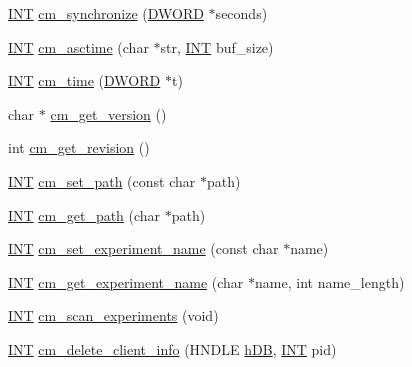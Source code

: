 \begin{DoxyCompactItemize}
\item 
\hyperlink{vppg_8h_a392e62da233ed3e2f7c3fd4f487a3896}{INT} \hyperlink{group__cmfunctionc_ga89d09a1a52a983be86ef502614fe555c}{cm\_\-synchronize} (\hyperlink{vt2_8h_a798af1e30bc65f319c1a246cecf59e39}{DWORD} $\ast$seconds)
\item 
\hyperlink{vppg_8h_a392e62da233ed3e2f7c3fd4f487a3896}{INT} \hyperlink{group__cmfunctionc_gac340cbe250a502de8befa8c0beeac945}{cm\_\-asctime} (char $\ast$str, \hyperlink{vppg_8h_a392e62da233ed3e2f7c3fd4f487a3896}{INT} buf\_\-size)
\item 
\hyperlink{vppg_8h_a392e62da233ed3e2f7c3fd4f487a3896}{INT} \hyperlink{group__cmfunctionc_gaf53e87e278dd31007a84cf643eddba2b}{cm\_\-time} (\hyperlink{vt2_8h_a798af1e30bc65f319c1a246cecf59e39}{DWORD} $\ast$t)
\item 
char $\ast$ \hyperlink{group__cmfunctionc_ga9e7d38eff9b9d85d57fc2f4b2aacc9ab}{cm\_\-get\_\-version} ()
\item 
int \hyperlink{group__cmfunctionc_ga2bdca42b13df835e667b9258cb41c7e2}{cm\_\-get\_\-revision} ()
\item 
\hyperlink{vppg_8h_a392e62da233ed3e2f7c3fd4f487a3896}{INT} \hyperlink{group__cmfunctionc_ga006e27d46e2dd0eedde0a753f1b9ed67}{cm\_\-set\_\-path} (const char $\ast$path)
\item 
\hyperlink{vppg_8h_a392e62da233ed3e2f7c3fd4f487a3896}{INT} \hyperlink{group__cmfunctionc_gacfe11e1f0404bc4112d749eb0793671e}{cm\_\-get\_\-path} (char $\ast$path)
\item 
\hyperlink{vppg_8h_a392e62da233ed3e2f7c3fd4f487a3896}{INT} \hyperlink{group__cmfunctionc_gafe97f63815e3eacedd504bca6b22032a}{cm\_\-set\_\-experiment\_\-name} (const char $\ast$name)
\item 
\hyperlink{vppg_8h_a392e62da233ed3e2f7c3fd4f487a3896}{INT} \hyperlink{group__cmfunctionc_ga0ca8a626fc6fbdbfde87294eb38ad94d}{cm\_\-get\_\-experiment\_\-name} (char $\ast$name, int name\_\-length)
\item 
\hyperlink{vppg_8h_a392e62da233ed3e2f7c3fd4f487a3896}{INT} \hyperlink{group__cmfunctionc_gacd0316ccf242cd450281c5fd153a985b}{cm\_\-scan\_\-experiments} (void)
\item 
\hyperlink{vppg_8h_a392e62da233ed3e2f7c3fd4f487a3896}{INT} \hyperlink{group__cmfunctionc_gace4f91b59217b2dc6216065cc41377a1}{cm\_\-delete\_\-client\_\-info} (HNDLE \hyperlink{mevb_8c_ab1f60c53f74e806a3b9f687af38d7421}{hDB}, \hyperlink{vppg_8h_a392e62da233ed3e2f7c3fd4f487a3896}{INT} pid)
\item 

\end{DoxyCompactItemize}

